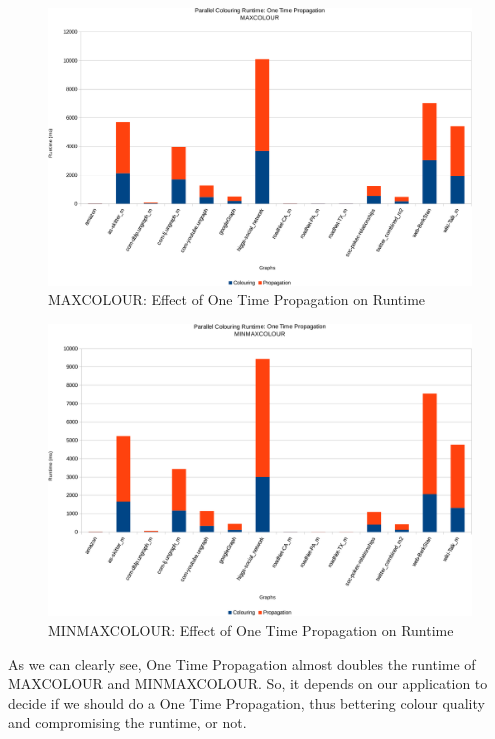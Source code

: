 \documentclass[MTech]{iitmdiss}
\begin{document}
\begin{figure}[h]
    \centering
    \includegraphics[width=\textwidth,keepaspectratio=true]{chartNewest9.pdf}
    \caption{
        MAXCOLOUR: Effect of One Time Propagation on Runtime
    }
    \label{fig:chart9}
\end{figure}

\begin{figure}[h]
    \centering
    \includegraphics[width=\textwidth,keepaspectratio=true]{chartNewest10.pdf}
    \caption{
        MINMAXCOLOUR: Effect of One Time Propagation on Runtime
    }
    \label{fig:chart10}
\end{figure}

As we can clearly see, One Time Propagation almost doubles the runtime of MAXCOLOUR and MINMAXCOLOUR. So, it depends on our application to decide if we should do a One Time Propagation, thus bettering colour quality and compromising the runtime, or not.
\end{document}
